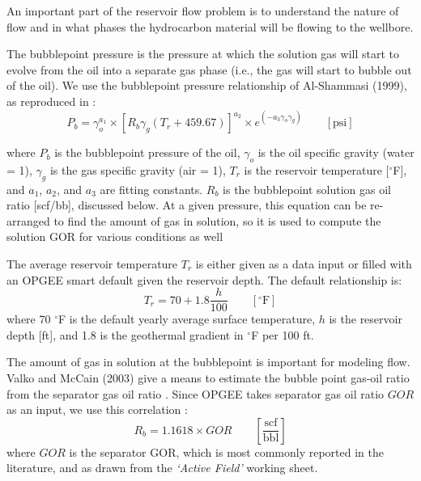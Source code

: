 \documentclass[11pt]{report}
\newcommand{\marg}[1]{{\footnotesize\textit{\textcolor{stanford}{'#1'}}}}
\newcommand{\marginnote}[1]{\marginpar{\marg{#1}}}
\newcommand{\sheet}[1]{\textit{`{#1}'}}
\newcommand{\eqnunit}[1]{\quad\quad \scriptstyle{\left[\text{#1}\right]}}
\newcommand{\eqnunitfrac}[2]{\quad\quad \scriptstyle{\left[\frac{\text{#1}}{\text{#2}}\right]}}
\begin{document}
\clearpage

An important part of the reservoir flow problem is to understand the nature of flow and in what phases the hydrocarbon material will be flowing to the wellbore.

The bubblepoint pressure is the pressure at which the solution gas will start to evolve from the oil into a separate gas phase (i.e., the gas will start to bubble out of the oil).  We use the  \marginnote{Reservoir \\ M68} bubblepoint pressure relationship of Al-Shammasi (1999), as reproduced in \cite[vol 1, Table 6.6]{Fanchi2007}:
\begin{equation}
P_{b} =\gamma_{o}^{a_1}\times\left[R_b \gamma_g (T_r+459.67)\right]^{a_2}\times e^{(-a_3 \gamma_o \gamma_g)} \eqnunit{psi}
\label{eq:BPP}
\end{equation}

where $P_b$ is the bubblepoint pressure of the oil, $\gamma_o$ is the oil specific gravity (water = 1), $\gamma_g$ is the gas specific gravity (air = 1), $T_r$ is the reservoir temperature [$^\circ$F], and $a_1$, $a_2$, and $a_3$ are fitting constants.  $R_b$ is the bubblepoint solution gas oil ratio [scf/bb], discussed below. At a given pressure, this equation can be re-arranged to find the amount of gas in solution, so it is used to compute the solution GOR for various conditions as well \cite[p. 273]{Fanchi2007}

The average reservoir  \marginnote{Active Field \\ K69} temperature $T_r$ is either given as a data input or filled with an OPGEE smart default given the reservoir depth. The default relationship is: 
\begin{equation}
T_r = 70 + 1.8 \frac{h}{100}  \eqnunit{$^\circ$F}
\label{eq:Tr}
\end{equation}
where 70 $^\circ$F is the default yearly average surface temperature, $h$ is the reservoir depth [ft], and 1.8 is the geothermal gradient in $^\circ$F per 100 ft.

The amount of gas in solution at the bubblepoint is important for modeling flow. Valko and McCain (2003) give a means to estimate the bubble point gas-oil ratio from the separator gas oil ratio \cite{Valko2003}. Since OPGEE takes separator gas oil ratio $GOR$ as an input, we use this correlation \cite[eq. 3-3]{Valko2003}: \marginnote{Reservoir \\ M67}
\begin{equation}
R_b = 1.1618 \times GOR \eqnunitfrac{scf}{bbl} 
\label{eq:GORb}
\end{equation}
where $GOR$ is the separator GOR, which is most commonly reported in the literature, and as drawn from the \sheet{Active Field} working sheet.
\end{document}
